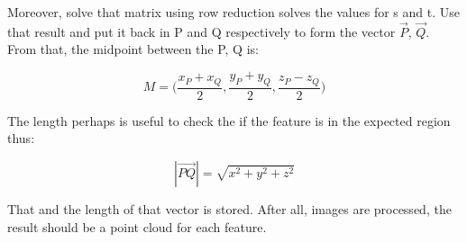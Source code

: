Moreover, solve that matrix using row reduction solves the values for s and t.
Use that result and put it back in P and Q respectively to form the vector $\overrightarrow{P}$, $\overrightarrow{Q}$.
From that, the midpoint between the P, Q is:

\begin{equation}
    M = \big( \frac{x_P + x_Q}{2}, \frac{y_P + y_Q}{2}, \frac{z_P - z_Q}{2} \big)
\end{equation}

The length perhaps is useful to check the if the feature is in the expected region thus:

\begin{equation}
    |\overrightarrow{PQ}| = \sqrt{x^2 + y^2 + z^2}
\end{equation}

That and the length of that vector is stored.
After all, images are processed, the result should be a point cloud for each feature.

